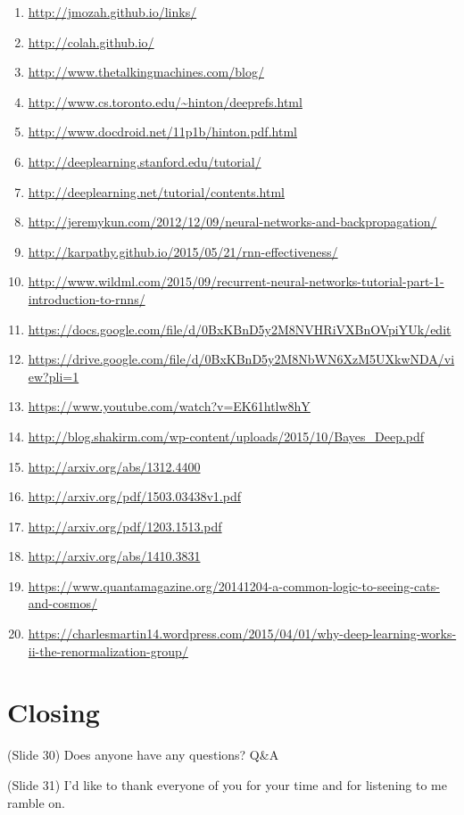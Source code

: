 \documentclass[twocolumn]{article}
\begin{document}
\begin{enumerate}
\item\url{http://jmozah.github.io/links/}
\item\url{http://colah.github.io/}
\item\url{http://www.thetalkingmachines.com/blog/}
\item\url{http://www.cs.toronto.edu/~hinton/deeprefs.html}
\item\url{http://www.docdroid.net/11p1b/hinton.pdf.html}
\item\url{http://deeplearning.stanford.edu/tutorial/}
\item\url{http://deeplearning.net/tutorial/contents.html}
\item\url{http://jeremykun.com/2012/12/09/neural-networks-and-backpropagation/}
\item\url{http://karpathy.github.io/2015/05/21/rnn-effectiveness/}
\item\url{http://www.wildml.com/2015/09/recurrent-neural-networks-tutorial-part-1-introduction-to-rnns/}
\item\url{https://docs.google.com/file/d/0BxKBnD5y2M8NVHRiVXBnOVpiYUk/edit}
\item\url{https://drive.google.com/file/d/0BxKBnD5y2M8NbWN6XzM5UXkwNDA/view?pli=1}
\item\url{https://www.youtube.com/watch?v=EK61htlw8hY}
\item\url{http://blog.shakirm.com/wp-content/uploads/2015/10/Bayes_Deep.pdf}
\item\url{http://arxiv.org/abs/1312.4400}
\item\url{http://arxiv.org/pdf/1503.03438v1.pdf}
\item\url{http://arxiv.org/pdf/1203.1513.pdf}
\item\url{http://arxiv.org/abs/1410.3831}
\item\url{https://www.quantamagazine.org/20141204-a-common-logic-to-seeing-cats-and-cosmos/}
\item\url{https://charlesmartin14.wordpress.com/2015/04/01/why-deep-learning-works-ii-the-renormalization-group/}
\end{enumerate}

\section{Closing}
(Slide 30) Does anyone have any questions? Q\&A

(Slide 31) I'd like to thank everyone of you for your time and for listening to
me ramble on.
\end{document}

